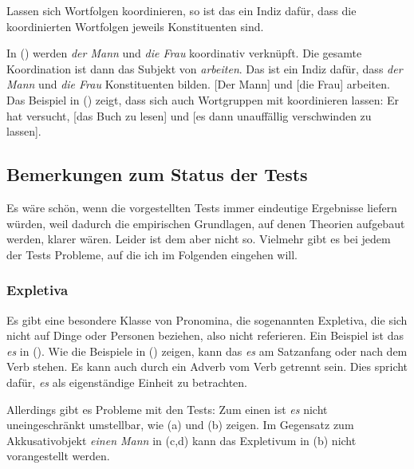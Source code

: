 \documentclass[ number=45
			   ,series=eotms
			   ,printondemand
			  ]{langsci}
\let\citew=\citealp
\newcommand{\LATER}[1]{}
\begin{document}
{Lassen sich Wortfolgen koordinieren, so ist das ein Indiz dafür, dass die
koordinierten Wortfolgen jeweils Konstituenten sind.

In () werden \emph{der Mann} und \emph{die Frau} koordinativ verknüpft.
Die gesamte Koordination ist dann das Subjekt von \emph{arbeiten}.
Das ist ein Indiz dafür, dass \emph{der Mann}
und \emph{die Frau} Konstituenten bilden.
\ea
{}[Der Mann] und [die Frau] arbeiten.
\z
Das Beispiel in () zeigt, dass sich auch Wortgruppen mit \zui koordinieren lassen:
\ea
Er hat versucht, [das Buch zu lesen] und [es dann unauffällig verschwinden zu lassen].
\z

\subsection{Bemerkungen zum Status der Tests}
\label{sec-status-der-ktests}

Es wäre schön, wenn die vorgestellten Tests immer eindeutige Ergebnisse liefern würden,
weil dadurch die empirischen Grundlagen, auf denen Theorien aufgebaut werden, klarer
wären. Leider ist dem aber nicht so. Vielmehr gibt es bei jedem der Tests Probleme,
auf die ich im Folgenden eingehen will.\LATER{AL: \citew{GHS87a-u-gekauft,Welke2007a-u}}

\subsubsection{Expletiva}

Es gibt eine besondere Klasse von Pronomina, die sogenannten Expletiva, die sich nicht
auf Dinge oder Personen beziehen, also nicht referieren. Ein Beispiel ist das \emph{es} in
().
\eal
{}
\zl
Wie die Beispiele in () zeigen, kann das \emph{es} am Satzanfang
oder nach dem Verb stehen. Es kann auch durch ein Adverb vom Verb getrennt sein.
Dies spricht dafür, \emph{es} als eigenständige Einheit zu betrachten.

Allerdings gibt es Probleme mit den Tests: Zum einen ist \emph{es} nicht
uneingeschränkt umstellbar, wie (a) und (b) zeigen.
\eal
{}
\zl
\eal
{}
\zl
Im Gegensatz zum Akkusativobjekt \emph{einen Mann} in (c,d) kann das Expletivum in (b) nicht
vorangestellt werden.

}
\end{document}
